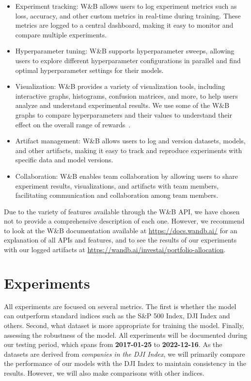 \documentclass[../xlapes02]{subfiles}
\begin{document}
    \begin{itemize}
        \item Experiment tracking: W\&B allows users to log experiment metrics such as loss, accuracy, and other custom metrics in real-time during training. These metrics are logged to a central dashboard, making it easy to monitor and compare multiple experiments.
        \item Hyperparameter tuning: W\&B supports hyperparameter sweeps, allowing users to explore different hyperparameter configurations in parallel and find optimal hyperparameter settings for their models.
        \item Visualization: W\&B provides a variety of visualization tools, including interactive graphs, histograms, confusion matrices, and more, to help users analyze and understand experimental results. We use some of the W\&B graphs to compare hyperparameters and their values to understand their effect on the overall range of rewards~.
        \item Artifact management: W\&B allows users to log and version datasets, models, and other artifacts, making it easy to track and reproduce experiments with specific data and model versions.
        \item Collaboration: W\&B enables team collaboration by allowing users to share experiment results, visualizations, and artifacts with team members, facilitating communication and collaboration among team members.
    \end{itemize}

    Due to the variety of features available through the W\&B API, we have chosen not to provide a comprehensive description of each one. However, we recommend to look at the W\&B documentation available at \url{https://docs.wandb.ai/} for an explanation of all APIs and features, and to see the results of our experiments with our logged artifacts at \url{https://wandb.ai/investai/portfolio-allocation}.


    \section{Experiments}\label{sec:experiments}
    All experiments are focused on several metrics. The first is whether the model can outperform standard indices such as the S\&P 500 Index, DJI Index and others. Second, what dataset is more appropriate for training the model. Finally, assessing the robustness of the model. All experiments will be documented during our testing period, which spans from \textbf{2017-01-25} to \textbf{2022-12-16}. As the datasets are derived from \emph{companies in the DJI Index}, we will primarily compare the performance of our models with the DJI Index to maintain consistency in the results. However, we will also make comparisons with other indices.
\end{document}
